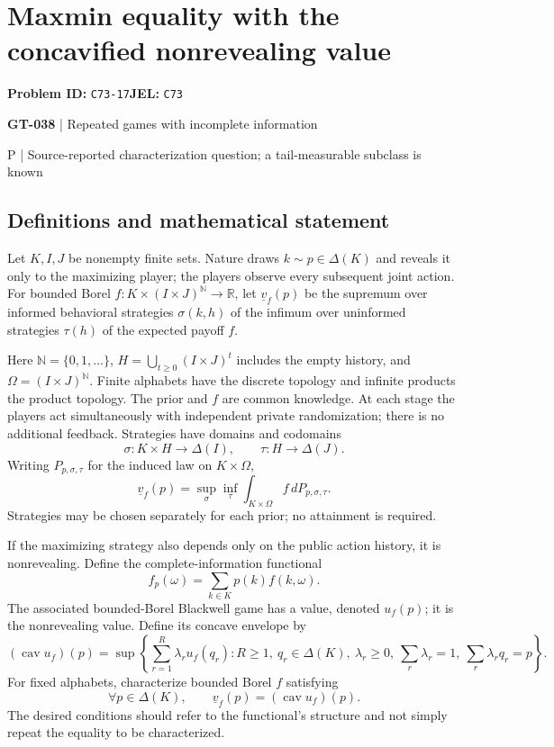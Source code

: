 \documentclass[11pt,a4paper]{article}
\begin{document}
\section*{Maxmin equality with the concavified nonrevealing value}
\textbf{Problem ID:} \texttt{C73-17}\quad \textbf{JEL:} \texttt{C73}\par
\label{problem:OP-0168}
\label{game:GT-038}
{\sffamily\small\color{muted}
{\sffamily\small\color{muted}\textbf{GT-038} | Repeated games with incomplete information\par P | Source-reported characterization question; a tail-measurable subclass is known\par}
\par}
\subsection*{Definitions and mathematical statement}
Let $K,I,J$ be nonempty finite sets. Nature draws $k\sim p\in\Delta(K)$ and reveals it only to the maximizing player; the players observe every subsequent joint action. For bounded Borel $f:K\times(I\times J)^{\mathbb N}\to\mathbb R$, let $\underline v_f(p)$ be the supremum over informed behavioral strategies $\sigma(k,h)$ of the infimum over uninformed strategies $\tau(h)$ of the expected payoff $f$.

Here $\mathbb N=\{0,1,\ldots\}$, $H=\bigcup_{t\geq0}(I\times J)^t$ includes the empty history, and $\Omega=(I\times J)^{\mathbb N}$. Finite alphabets have the discrete topology and infinite products the product topology. The prior and $f$ are common knowledge. At each stage the players act simultaneously with independent private randomization; there is no additional feedback. Strategies have domains and codomains
\[
 \sigma:K\times H\to\Delta(I),\qquad \tau:H\to\Delta(J).
\]
Writing $P_{p,\sigma,\tau}$ for the induced law on $K\times\Omega$,
\[
 \underline v_f(p)=\sup_\sigma\inf_\tau\int_{K\times\Omega} f\,dP_{p,\sigma,\tau}.
\]
Strategies may be chosen separately for each prior; no attainment is required.

If the maximizing strategy also depends only on the public action history, it is nonrevealing. Define the complete-information functional
\[
 f_p(\omega)=\sum_{k\in K}p(k)f(k,\omega).
\]
The associated bounded-Borel Blackwell game has a value, denoted $u_f(p)$; it is the nonrevealing value. Define its concave envelope by
\[
 (\operatorname{cav}u_f)(p)=
 \sup\left\{\sum_{r=1}^{R}\lambda_r u_f(q_r):
 R\geq1,\ q_r\in\Delta(K),\ \lambda_r\geq0,\ 
 \sum_r\lambda_r=1,\ \sum_r\lambda_rq_r=p\right\}.
\]
For fixed alphabets, characterize bounded Borel $f$ satisfying
\[
 \forall p\in\Delta(K),\qquad
 \underline v_f(p)=(\operatorname{cav}u_f)(p).
\]
The desired conditions should refer to the functional's structure and not simply repeat the equality to be characterized.
\end{document}
